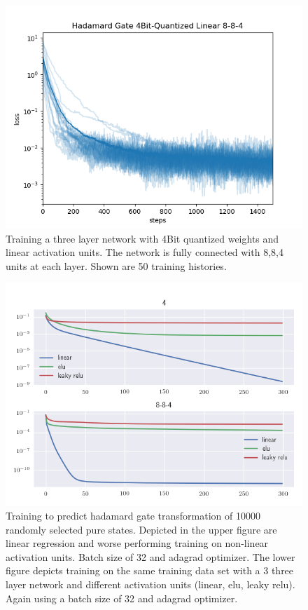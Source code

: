 \documentclass[a4paper]{article}
\begin{document}
\begin{figure}
\includegraphics[width=\linewidth]{../figures/8-8-4-traces-quantized/sweep_hadamard-quantized.png}
\caption{Training a three layer network with 4Bit quantized weights and linear activation units. 
The network is fully connected with 8,8,4 units at each layer. Shown are 50 training histories.}
\label{fig:relu_hadamard_8_4}
\end{figure}

\begin{figure}
\includegraphics[width=\linewidth]{../figures/non_linear.png}
\caption{Training to predict hadamard gate transformation of 10000 randomly selected pure states.
Depicted in the upper figure are linear regression and worse performing training on
non-linear activation units. Batch size of 32 and adagrad optimizer. The lower figure
depicts training on the same training data set with a 3 three layer network and
different activation units (linear, elu, leaky relu). Again using a batch size of 32 and
adagrad optimizer.
}
\label{fig:relu_hadamard_8_4}
\end{figure}
\end{document}
